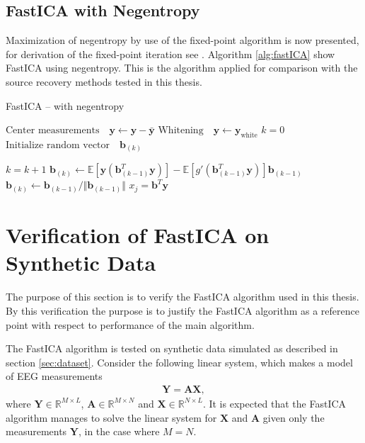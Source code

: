 \subsection{FastICA with Negentropy}
Maximization of negentropy by use of the fixed-point algorithm is now presented, for derivation of the fixed-point iteration see \cite[p. 188]{ICA}. Algorithm \ref{alg:fastICA} show FastICA using negentropy.
This is the algorithm applied for comparison with the source recovery methods tested in this thesis.    
\begin{algorithm}[H]
\caption{FastICA -- with negentropy }
\begin{algorithmic}[1]
			\State $\text{Center measurements} \quad \textbf{y} \gets \textbf{y} - \bar{\textbf{y}}$
			\State $\text{Whitening} \quad \textbf{y}\gets \textbf{y}_{\text{white}}$ 
			\EndProcedure  
			\State
			\State$k=0$            
            \State$\text{Initialize random vector} \quad \textbf{b}_{(k)}$ 
            
               		\State $k = k+1$
                	\State $\textbf{b}_{(k)} \gets \mathbb{E}[ \textbf{y}(\textbf{b}_{(k-1)}^T \textbf{y})] - \mathbb{E}[g'(\textbf{b}_{(k-1)}^T \textbf{y})] \textbf{b}_{(k-1)}$  
                	\State $\textbf{b}_{(k)} \gets \textbf{b}_{(k-1)}/\Vert \textbf{b}_{(k-1)} \Vert $ 
          		\EndWhile
          		\State $x_{j} = \textbf{b}^T\textbf{y}$
          	\EndFor
          	
            \EndProcedure
        \end{algorithmic} 
        \label{alg:fastICA}
\end{algorithm}

\section{Verification of FastICA on Synthetic Data}\label{app:ica_test}
The purpose of this section is to verify the FastICA algorithm used in this thesis. By this verification the purpose is to justify the FastICA algorithm as a reference point with respect to performance of the main algorithm.

The FastICA algorithm is tested on synthetic data simulated as described in section \ref{sec:dataset}. 
Consider the following linear system, which makes a model of EEG measurements 
\begin{align*}
\mathbf{Y} = \mathbf{AX},
\end{align*}
where $\mathbf{Y} \in \mathbb{R}^{M \times L}$, $\mathbf{A} \in \mathbb{R}^{M\times N}$ and $\mathbf{X} \in \mathbb{R}^{N \times L}$. 
It is expected that the FastICA algorithm manages to solve the linear system for $\mathbf{X}$ and $\mathbf{A}$ given only the measurements $\mathbf{Y}$, in the case where $M = N$.  

